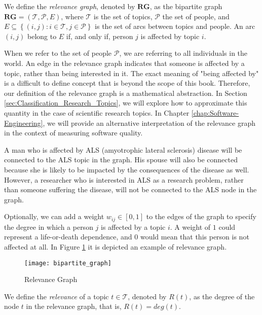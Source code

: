 \begin{definition}
\label{def:relevance-graph}
We define the \emph{relevance graph}, denoted by $\mathbf{RG}$, as the bipartite graph $\mathbf{RG} = (\mathcal{T}, \mathcal{P}, E)$, where $\mathcal{T}$ is the set of topics, $\mathcal{P}$ the set of people, and $E\subseteq\left\{ \left(i,j\right):i\in \mathcal{T},j\in \mathcal{P} \right\}$ is the set of arcs between topics and people. An arc $(i, j)$ belong to $E$ if, and only if, person $j$ is affected by topic $i$.
\end{definition}

When we refer to the set of people $\mathcal{P}$, we are referring to all individuals in the world. An edge in the relevance graph indicates that someone is affected by a topic, rather than being interested in it. The exact meaning of "being affected by" is a difficult to define concept that is beyond the scope of this book. Therefore, our definition of the relevance graph is a mathematical abstraction. In Section \ref{sec:Classification_Research_Topics}, we will explore how to approximate this quantity in the case of scientific research topics. In Chapter \ref{chap:Software-Engineering}, we will provide an alternative interpretation of the relevance graph in the context of measuring software quality.

\begin{example}
A man who is affected by ALS (amyotrophic lateral sclerosis) disease will be connected to the ALS topic in the graph. His spouse will also be connected because she is likely to be impacted by the consequences of the disease as well. However, a researcher who is interested in ALS as a research problem, rather than someone suffering the disease, will not be connected to the ALS node in the graph.
\end{example}

Optionally, we can add a weight $w_{ij}\in\left[0,1\right]$ to the edges of the graph to specify the degree in which a person $j$ is affected by a topic $i$. A weight of $1$ could represent a life-or-death dependence, and $0$ would mean that this person is not affected at all. In Figure \ref{fig:Relevance-Graph} it is depicted an example of relevance graph. 

\begin{figure}[h]
\centering\texttt{[image: bipartite\_graph]}
\caption{\label{fig:Relevance-Graph}Relevance Graph}
\end{figure}

\begin{definition}
\label{def:relevance}
We define the \emph{relevance} of a topic $t \in \mathcal{T}$, denoted by $R(t)$, as the degree of the node $t$ in the relevance graph, that is, $R(t) = deg(t)$.
\end{definition}

